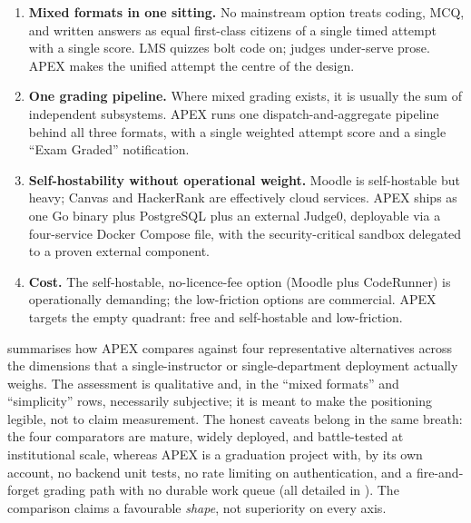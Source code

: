 \begin{enumerate}[leftmargin=1.4em]
  \item \textbf{Mixed formats in one sitting.} No mainstream option treats coding, MCQ,
        and written answers as equal first-class citizens of a single timed attempt with a
        single score. LMS quizzes bolt code on; judges under-serve prose. APEX makes the
        unified attempt the centre of the design.
  \item \textbf{One grading pipeline.} Where mixed grading exists, it is usually the sum of
        independent subsystems. APEX runs one dispatch-and-aggregate pipeline behind all
        three formats, with a single weighted attempt score and a single ``Exam Graded''
        notification.
  \item \textbf{Self-hostability without operational weight.} Moodle is self-hostable but
        heavy; Canvas and HackerRank are effectively cloud services. APEX ships as one Go
        binary plus PostgreSQL plus an external Judge0, deployable via a four-service Docker
        Compose file, with the security-critical sandbox delegated to a proven external
        component.
  \item \textbf{Cost.} The self-hostable, no-licence-fee option (Moodle plus CodeRunner)
        is operationally demanding; the low-friction options are commercial. APEX targets
        the empty quadrant: free and self-hostable and low-friction.
\end{enumerate}

 summarises how APEX compares against four representative
alternatives across the dimensions that a single-instructor or single-department deployment
actually weighs. The assessment is qualitative and, in the ``mixed formats'' and
``simplicity'' rows, necessarily subjective; it is meant to make the positioning legible,
not to claim measurement. The honest caveats belong in the same breath: the four
comparators are mature, widely deployed, and battle-tested at institutional scale, whereas
APEX is a graduation project with, by its own account, no backend unit tests, no rate
limiting on authentication, and a fire-and-forget grading path with no durable work queue
(all detailed in ). The comparison claims a favourable \emph{shape},
not superiority on every axis.

